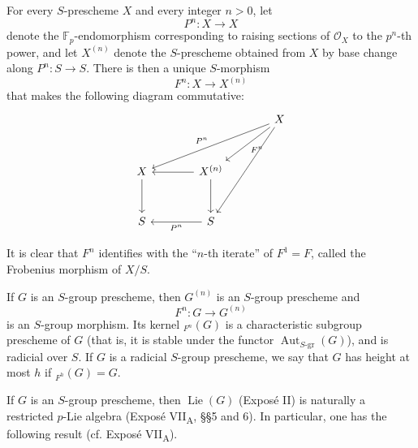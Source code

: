 
For every \(S\)-prescheme \(X\) and every integer \(n>0\), let
\[
  P^n:X\longrightarrow X
\]
denote the \(\mathbb F_p\)-endomorphism corresponding to raising
sections of \(\mathcal O_X\) to the \(p^n\)-th power, and let
\(X^{(n)}\) denote the \(S\)-prescheme obtained from \(X\) by base
change along \(P^n:S\to S\).  There is then a unique
\(S\)-morphism
\[
  F^n:X\longrightarrow X^{(n)}
\]
that makes the following diagram commutative:
\[
\begin{tikzcd}[column sep=3.7em,row sep=3.0em]
  {} & {} & X
    \arrow[dll,"P^n"']
    \arrow[dl,"F^n"]
    \arrow[ddl] \\
  X \arrow[d] &
  X^{(n)} \arrow[l] \arrow[d] &
  {} \\
  S &
  S \arrow[l,"P^n"] &
  {}
\end{tikzcd}
\]

It is clear that \(F^n\) identifies with the ``\(n\)-th iterate''
of \(F^1=F\), called the Frobenius morphism of \(X/S\).

If \(G\) is an \(S\)-group prescheme, then \(G^{(n)}\) is an
\(S\)-group prescheme and
\[
  F^n:G\longrightarrow G^{(n)}
\]
is an \(S\)-group morphism.  Its kernel
\({}_{F^n}(G)\) is a characteristic subgroup prescheme of \(G\)
(that is, it is stable under the functor
\(\operatorname{Aut}_{S\text{-}\mathrm{gr}}(G)\)), and is radicial
over \(S\).  If \(G\) is a radicial \(S\)-group prescheme, we say
that \(G\) has height at most \(h\) if
\({}_{F^h}(G)=G\).


If \(G\) is an \(S\)-group prescheme, then
\(\operatorname{Lie}(G)\) (Exposé II) is naturally a restricted
\(p\)-Lie algebra (Exposé VII\textsubscript{A}, §§5 and 6).  In
particular, one has the following result (cf. Exposé
VII\textsubscript{A}).


